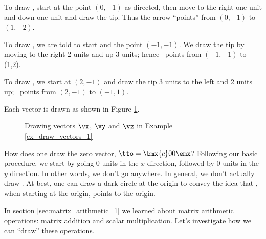 {To draw \vx, start at the point $(0,-1)$ as directed, then move to the right one unit and down one unit and draw the tip. Thus the arrow ``points'' from $(0,-1)$ to $(1,-2)$.

To draw \vy, we are told to start and the point $(-1,-1)$. We draw the tip by moving to the right 2 units and up 3 units; hence \vy\ points from $(-1,-1)$ to (1,2).

To draw \vz, we start at $(2,-1)$ and draw the tip 3 units to the left and 2 units up; \vz\ points from $(2,-1)$ to $(-1,1)$.

Each vector is drawn as shown in Figure \ref{fig:xyz}.

\begin{figure}[h!]
\begin{center}
\end{center}
\caption{Drawing vectors $\protect\vx$, $\protect\vy$ and $\protect\vz$ in Example \ref{ex_draw_vectors_1}}
\label{fig:xyz}
\end{figure}
}%


How does one draw the zero vector, $\tto =\bmx{c}0\\0\emx$? Following our basic procedure, we start by going 0 units in the $x$ direction, followed by 0 units in the $y$ direction. In other words, we don't go anywhere. 
In general, we don't actually draw \tto. At best, one can draw a dark circle at the origin to convey the idea that \tto, when starting at the origin, points to the origin.

In section \ref{sec:matrix_arithmetic_1} we learned about matrix arithmetic operations: matrix addition and scalar multiplication. Let's investigate how we can ``draw'' these operations.\\

